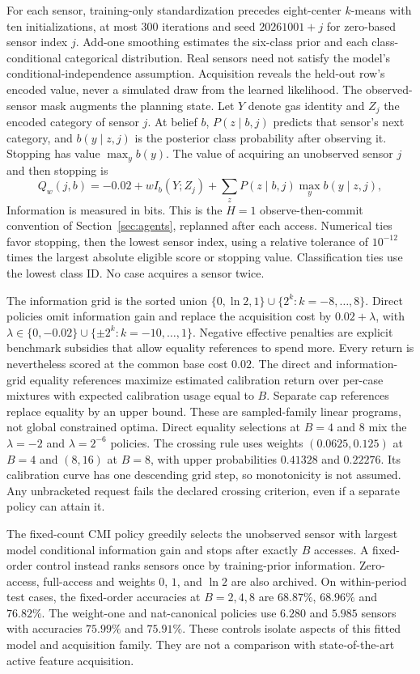 \documentclass[manuscript, screen, review]{jair}
\begin{document}
For each sensor, training-only standardization precedes eight-center $k$-means with ten initializations, at most $300$ iterations and seed $20261001+j$ for zero-based sensor index $j$. Add-one smoothing estimates the six-class prior and each class-conditional categorical distribution. Real sensors need not satisfy the model's conditional-independence assumption. Acquisition reveals the held-out row's encoded value, never a simulated draw from the learned likelihood. The observed-sensor mask augments the planning state. Let $Y$ denote gas identity and $Z_j$ the encoded category of sensor $j$. At belief $b$, $P(z\mid b,j)$ predicts that sensor's next category, and $b(y\mid z,j)$ is the posterior class probability after observing it. Stopping has value $\max_y b(y)$. The value of acquiring an unobserved sensor $j$ and then stopping is
\[
Q_w(j,b)=-0.02+wI_b(Y;Z_j)+\sum_z P(z\mid b,j)\max_y b(y\mid z,j),
\]
Information is measured in bits. This is the $H=1$ observe-then-commit convention of Section~\ref{sec:agents}, replanned after each access. Numerical ties favor stopping, then the lowest sensor index, using a relative tolerance of $10^{-12}$ times the largest absolute eligible score or stopping value. Classification ties use the lowest class ID. No case acquires a sensor twice.

The information grid is the sorted union $\{0,\ln2,1\}\cup\{2^k:k=-8,\ldots,8\}$. Direct policies omit information gain and replace the acquisition cost by $0.02+\lambda$, with $\lambda\in\{0,-0.02\}\cup\{\pm2^k:k=-10,\ldots,1\}$. Negative effective penalties are explicit benchmark subsidies that allow equality references to spend more. Every return is nevertheless scored at the common base cost $0.02$. The direct and information-grid equality references maximize estimated calibration return over per-case mixtures with expected calibration usage equal to $B$. Separate cap references replace equality by an upper bound. These are sampled-family linear programs, not global constrained optima. Direct equality selections at $B=4$ and $8$ mix the $\lambda=-2$ and $\lambda=2^{-6}$ policies. The crossing rule uses weights $(0.0625,0.125)$ at $B=4$ and $(8,16)$ at $B=8$, with upper probabilities $0.41328$ and $0.22276$. Its calibration curve has one descending grid step, so monotonicity is not assumed. Any unbracketed request fails the declared crossing criterion, even if a separate policy can attain it.

The fixed-count CMI policy greedily selects the unobserved sensor with largest model conditional information gain and stops after exactly $B$ accesses. A fixed-order control instead ranks sensors once by training-prior information. Zero-access, full-access and weights $0$, $1$, and $\ln2$ are also archived. On within-period test cases, the fixed-order accuracies at $B=2,4,8$ are $68.87\%$, $68.96\%$ and $76.82\%$. The weight-one and nat-canonical policies use $6.280$ and $5.985$ sensors with accuracies $75.99\%$ and $75.91\%$. These controls isolate aspects of this fitted model and acquisition family. They are not a comparison with state-of-the-art active feature acquisition.
\end{document}
